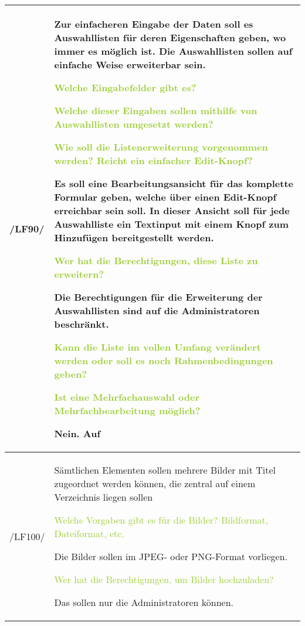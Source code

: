 \begin{tabular}[ht] {l | p{13cm}}
    \hline
    /LF90/ & Zur einfacheren Eingabe der Daten soll es Auswahllisten für deren Eigenschaften geben, wo immer es möglich ist. Die Auswahllisten sollen auf einfache Weise erweiterbar sein. 
    
    \textcolor{YellowGreen}{Welche Eingabefelder gibt es?}

    \textcolor{NavyBlue}{}
    \textcolor{YellowGreen}{Welche dieser Eingaben sollen mithilfe von Auswahllisten umgesetzt werden?}

    \textcolor{NavyBlue}{}
    \textcolor{YellowGreen}{Wie soll die Listenerweiterung vorgenommen werden? Reicht ein einfacher \grqq{}Edit\grqq{}-Knopf?}

    \textcolor{NavyBlue}{Es soll eine Bearbeitungsansicht für das komplette Formular geben, welche über einen \grqq{}Edit\grqq{}-Knopf erreichbar sein soll. In dieser Ansicht soll für jede Auswahlliste ein Textinput mit einem Knopf zum Hinzufügen bereitgestellt werden.}

    \textcolor{YellowGreen}{Wer hat die Berechtigungen, diese Liste zu erweitern?}

    \textcolor{NavyBlue}{Die Berechtigungen für die Erweiterung der Auswahllisten sind auf die Administratoren beschränkt.}

    \textcolor{YellowGreen}{Kann die Liste im vollen Umfang verändert werden oder soll es noch Rahmenbedingungen geben?}

    \textcolor{NavyBlue}{}

    \textcolor{YellowGreen}{Ist eine Mehrfachauswahl oder Mehrfachbearbeitung möglich?}

    \textcolor{NavyBlue}{Nein. Auf }
    \\
    \hline
    /LF100/ & Sämtlichen Elementen sollen mehrere Bilder mit Titel zugeordnet werden können, die zentral auf einem Verzeichnis liegen sollen 
    
    \textcolor{YellowGreen}{Welche Vorgaben gibt es für die Bilder? Bildformat, Dateiformat, etc.}

    \textcolor{NavyBlue}{Die Bilder sollen im JPEG- oder PNG-Format vorliegen.}

    \textcolor{YellowGreen}{Wer hat die Berechtigungen, um Bilder hochzuladen?}

    \textcolor{NavyBlue}{Das sollen nur die Administratoren können.}


\end{tabular}
